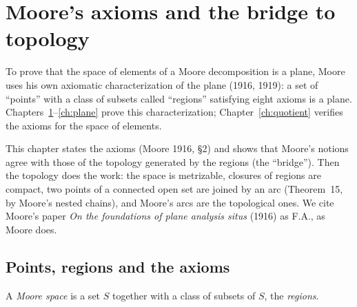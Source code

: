\chapter{Moore's axioms and the bridge to topology}\label{ch:axioms}

To prove that the space of elements of a Moore decomposition is a plane, Moore uses his own
axiomatic characterization of the plane (1916, 1919): a set of ``points'' with a class of subsets
called ``regions'' satisfying eight axioms is a plane. Chapters~\ref{ch:axioms}--\ref{ch:plane}
prove this characterization; Chapter~\ref{ch:quotient} verifies the axioms for the space of elements.

This chapter states the axioms (Moore 1916, \S2) and shows that Moore's notions agree with those of
the topology generated by the regions (the ``bridge''). Then the topology does the work: the space is
metrizable, closures of regions are compact, two points of a connected open set are joined by an arc
(Theorem~15, by Moore's nested chains), and Moore's arcs are the topological ones. We cite Moore's
paper \emph{On the foundations of plane analysis situs} (1916) as F.A., as Moore does.

\section{Points, regions and the axioms}\label{sec:axioms}

A \emph{Moore space} is a set $S$ together with a class of subsets of $S$, the \emph{regions}.


